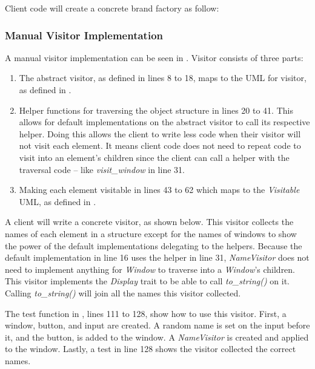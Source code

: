 Client code will create a concrete brand factory as follow:


\subsubsection{Manual Visitor Implementation}
\label{sec:visitor-manual-implementation}

A manual visitor implementation can be seen in .
Visitor consists of three parts:
\begin{enumerate}
	\item The abstract visitor, as defined in lines 8 to 18, maps to the UML for visitor, as defined in .
	\item Helper functions for traversing the object structure \cite{gamma_94_01} in lines 20 to 41.
	      This allows for default implementations on the abstract visitor to call its respective helper.
	      Doing this allows the client to write less code when their visitor will not visit each element.
	      It means client code does not need to repeat code to visit into an element's children since the client can call a helper with the traversal code -- like \textit{visit\_window} in line 31.
	\item Making each element visitable in lines 43 to 62 which maps to the \textit{Visitable} UML, as defined in .
\end{enumerate}

A client will write a concrete visitor, as shown below.
This visitor collects the names of each element in a structure except for the names of windows to show the power of the default implementations delegating to the helpers.
Because the default implementation in  line 16 uses the helper in line 31, \textit{NameVisitor} does not need to implement anything for \textit{Window} to traverse into a \textit{Window}'s children.
This visitor implements the \textit{Display} trait to be able to call \textit{to\_string()} on it.
Calling \textit{to\_string()} will join all the names this visitor collected.


The test function in , lines 111 to 128, show how to use this visitor.
First, a window, button, and input are created.
A random name is set on the input before it, and the button, is added to the window.
A \textit{NameVisitor} is created and applied to the window.
Lastly, a test in line 128 shows the visitor collected the correct names.

